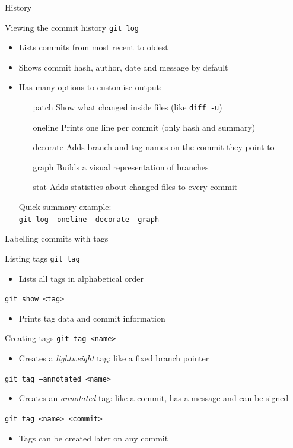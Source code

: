 \documentclass{beamer}
\begin{document}
\begin{frame}{History}
  \begin{block}{Viewing the commit history}
    \texttt{git log}
    \begin{itemize}
    \item Lists commits from most recent to oldest
    \item Shows commit hash, author, date and message by default
    \item Has many options to customise output:
      \begin{itemize}
      \item[patch] Show what changed inside files (like \texttt{diff -u})
      \item[oneline] Prints one line per commit (only hash and summary)
      \item[decorate] Adds branch and tag names on the commit they point to
      \item[graph] Builds a visual representation of branches
      \item[stat] Adds statistics about changed files to every commit
      \end{itemize}
      Quick summary example:\\\texttt{git log --oneline --decorate --graph}
    \end{itemize}
  \end{block}
\end{frame}

\begin{frame}{Labelling commits with tags}
  \begin{block}{Listing tags}
    \texttt{git tag}
    \begin{itemize}
    \item Lists all tags in alphabetical order
    \end{itemize}
    \texttt{git show <tag>}
    \begin{itemize}
    \item Prints tag data and commit information
    \end{itemize}
  \end{block}
  \begin{block}{Creating tags}
    \texttt{git tag <name>}
    \begin{itemize}
    \item Creates a \emph{lightweight} tag: like a fixed branch pointer
    \end{itemize}
    \texttt{git tag --annotated <name>}
    \begin{itemize}
    \item Creates an \emph{annotated} tag: like a commit, has a message and can be signed
    \end{itemize}
    \texttt{git tag <name> <commit>}
    \begin{itemize}
    \item Tags can be created later on any commit
    \end{itemize}
  \end{block}
\end{frame}
\end{document}
